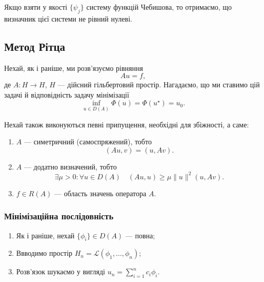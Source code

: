 Якщо взяти у якості $\{\psi_j\}$ систему функцій Чебишова, то отримаємо, що визначник цієї системи не рівний нулеві.

\subsection{Метод Рітца}

Нехай, як і раніше, ми розв'язуємо рівняння
\begin{equation}
    \label{eq:2.2.1}
    A u = f,
\end{equation}
де $A: H \to H$, $H$ --- дійсний гільбертовий простір. Нагадаємо, що ми ставимо цій задачі й відповідність задачу мінімізації
\begin{equation}
    \label{eq:2.2.2}
    \inf_{u \in D(A)} \Phi(u) = \Phi(u^\star) = u_0.
\end{equation}

Нехай також виконуються певні припущення, необхідні для збіжності, а саме:
\begin{enumerate}
    \item $A$ --- симетричний (самоспряжений), тобто
    \begin{equation}
        \label{eq:2.2.3}
        (A u, v) = (u, A v).
    \end{equation}
    
    \item $A$ --- додатно визначений, тобто
    \begin{equation}
        \label{eq:2.2.4}
        \exists \mu > 0: \forall u \in D(A) \quad (A u, u) \ge \mu \|u\|^2 (u, A v).
    \end{equation}
    
    \item $f \in R(A)$ --- область значень оператора $A$.
\end{enumerate}

\subsubsection{Мінімізаційна послідовність}

\begin{enumerate}
    \item Як і раніше, нехай $\{\phi_i\} \in D(A)$ --- повна;
    \item Ввводимо простір $H_n = \mathcal{L}(\phi_1, \ldots, \phi_n)$;
    \item Розв'язок шукаємо у вигляді $u_n = \sum_{i = 1}^n c_i \phi_i$.
\end{enumerate}

